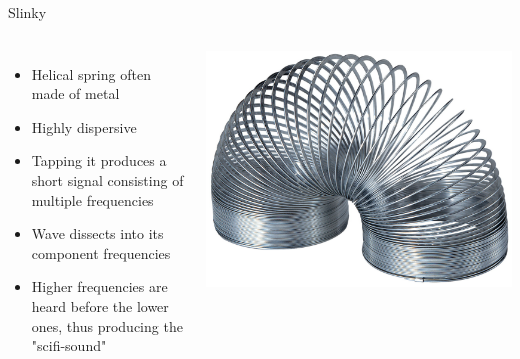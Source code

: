 \documentclass{beamer}
\begin{document}
	\begin{frame} {Slinky}
	\begin{columns}
		\begin{itemize}
			\item
			Helical spring often made of metal
			\item
			Highly dispersive
			\item
			Tapping it produces a short signal consisting of multiple frequencies
			\item
			Wave dissects into its component frequencies 
			\item
			Higher frequencies are heard before the lower ones, thus producing the "scifi-sound"
			\end{itemize}
			\includegraphics [scale=0.08]{images/slinky.jpg}
			
		\end{columns}
	\end{frame}
	
\end{document}
